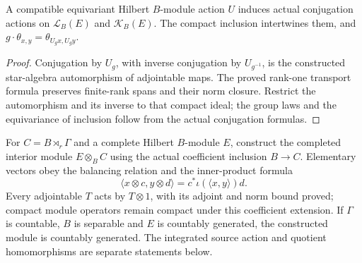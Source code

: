 \begin{proposition}\label{prop:descent-compact-conjugation}
\leanok
A compatible equivariant Hilbert $B$-module action $U$ induces actual
conjugation actions on $\mathcal L_B(E)$ and $\mathcal K_B(E)$.
The compact inclusion intertwines them, and
$g\cdot\theta_{x,y}=\theta_{U_gx,U_gy}$.
\end{proposition}
\begin{proof}
\leanok
Conjugation by $U_g$, with inverse conjugation by $U_{g^{-1}}$,
is the constructed star-algebra automorphism of adjointable maps.
The proved rank-one transport formula preserves finite-rank spans and
their norm closure. Restrict the automorphism and its inverse to that
compact ideal; the group laws and the equivariance of inclusion follow
from the actual conjugation formulas.
\end{proof}

\begin{definition}\label{def:descent-coefficient-module}
\leanok
For $C=B\rtimes_r\Gamma$ and a complete Hilbert $B$-module $E$,
construct the completed interior module $E\otimes_B C$ using the actual
coefficient inclusion $B\to C$. Elementary vectors obey the balancing
relation and the inner-product formula
\[
 \langle x\otimes c,y\otimes d\rangle
 =c^*\iota(\langle x,y\rangle)d.
\]
Every adjointable $T$ acts by $T\otimes1$, with its adjoint and norm
bound proved; compact module operators remain compact under this
coefficient extension. If $\Gamma$ is countable, $B$ is separable and
$E$ is countably generated, the constructed module is countably generated.
The integrated source action and quotient homomorphisms are separate
statements below.
\end{definition}


